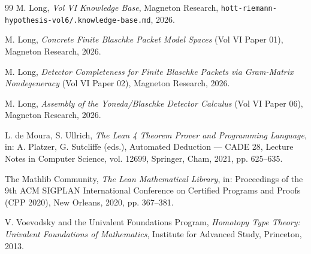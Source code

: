 \documentclass[12pt]{article}
\theoremstyle{definition}
\theoremstyle{remark}
\begin{document}
\begin{thebibliography}{99}
M. Long, \emph{Vol VI Knowledge Base}, Magneton Research,
\texttt{hott-riemann-hypothesis-vol6/.knowledge-base.md}, 2026.

M. Long, \emph{Concrete Finite Blaschke Packet Model Spaces} (Vol VI
Paper 01), Magneton Research, 2026.

M. Long, \emph{Detector Completeness for Finite Blaschke Packets via
Gram-Matrix Nondegeneracy} (Vol VI Paper 02), Magneton Research, 2026.

M. Long, \emph{Assembly of the Yoneda/Blaschke Detector Calculus} (Vol
VI Paper 06), Magneton Research, 2026.

L. de Moura, S. Ullrich, \emph{The Lean 4 Theorem Prover and
Programming Language}, in: A. Platzer, G. Sutcliffe (eds.), Automated
Deduction --- CADE 28, Lecture Notes in Computer Science, vol. 12699,
Springer, Cham, 2021, pp. 625--635.

The Mathlib Community, \emph{The Lean Mathematical Library}, in:
Proceedings of the 9th ACM SIGPLAN International Conference on
Certified Programs and Proofs (CPP 2020), New Orleans, 2020,
pp. 367--381.

V. Voevodsky and the Univalent Foundations Program, \emph{Homotopy
Type Theory: Univalent Foundations of Mathematics}, Institute for
Advanced Study, Princeton, 2013.

\end{thebibliography}
\end{document}
